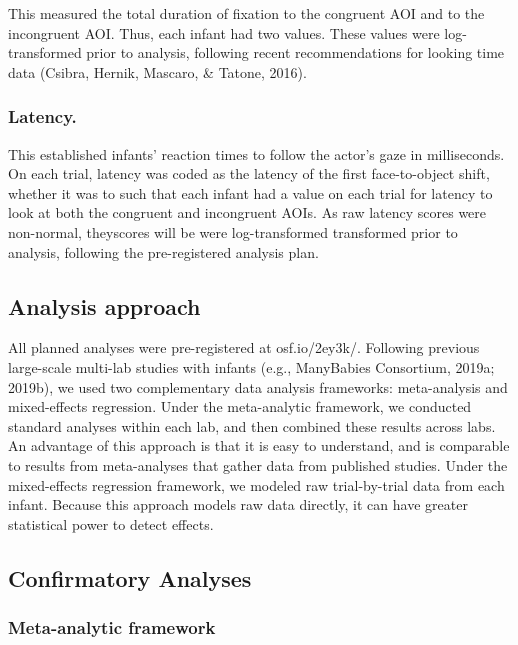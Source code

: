 \documentclass[,man,floatsintext]{apa6}
\begin{document}
This measured the total duration of fixation to the congruent AOI and to the incongruent AOI. Thus, each infant had two values. These values were log-transformed prior to analysis, following recent recommendations for looking time data (Csibra, Hernik, Mascaro, \& Tatone, 2016).

\hypertarget{latency.}{%
\subsubsection{Latency.}\label{latency.}}

This established infants' reaction times to follow the actor's gaze in milliseconds. On each trial, latency was coded as the latency of the first face-to-object shift, whether it was to such that each infant had a value on each trial for latency to look at both the congruent and incongruent AOIs. As raw latency scores were non-normal, theyscores will be were log-transformed transformed prior to analysis, following the pre-registered analysis plan.

\hypertarget{analysis-approach}{%
\subsection{Analysis approach}\label{analysis-approach}}

All planned analyses were pre-registered at osf.io/2ey3k/. Following previous large-scale multi-lab studies with infants (e.g., ManyBabies Consortium, 2019a; 2019b), we used two complementary data analysis frameworks: meta-analysis and mixed-effects regression. Under the meta-analytic framework, we conducted standard analyses within each lab, and then combined these results across labs. An advantage of this approach is that it is easy to understand, and is comparable to results from meta-analyses that gather data from published studies. Under the mixed-effects regression framework, we modeled raw trial-by-trial data from each infant. Because this approach models raw data directly, it can have greater statistical power to detect effects.

\hypertarget{confirmatory-analyses}{%
\subsection{Confirmatory Analyses}\label{confirmatory-analyses}}

\hypertarget{meta-analytic-framework}{%
\subsubsection{Meta-analytic framework}\label{meta-analytic-framework}}
\end{document}
